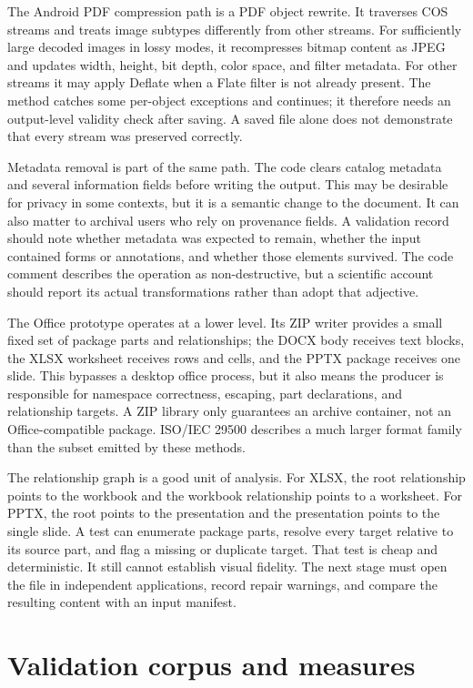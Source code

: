 \documentclass[10pt,letterpaper]{article}
\begin{document}
The Android PDF compression path is a PDF object rewrite. It traverses COS streams and treats image subtypes differently from other streams. For sufficiently large decoded images in lossy modes, it recompresses bitmap content as JPEG and updates width, height, bit depth, color space, and filter metadata. For other streams it may apply Deflate when a Flate filter is not already present. The method catches some per-object exceptions and continues; it therefore needs an output-level validity check after saving. A saved file alone does not demonstrate that every stream was preserved correctly.

Metadata removal is part of the same path. The code clears catalog metadata and several information fields before writing the output. This may be desirable for privacy in some contexts, but it is a semantic change to the document. It can also matter to archival users who rely on provenance fields. A validation record should note whether metadata was expected to remain, whether the input contained forms or annotations, and whether those elements survived. The code comment describes the operation as non-destructive, but a scientific account should report its actual transformations rather than adopt that adjective.

The Office prototype operates at a lower level. Its ZIP writer provides a small fixed set of package parts and relationships; the DOCX body receives text blocks, the XLSX worksheet receives rows and cells, and the PPTX package receives one slide. This bypasses a desktop office process, but it also means the producer is responsible for namespace correctness, escaping, part declarations, and relationship targets. A ZIP library only guarantees an archive container, not an Office-compatible package. ISO/IEC 29500 \cite{r3} describes a much larger format family than the subset emitted by these methods.

The relationship graph is a good unit of analysis. For XLSX, the root relationship points to the workbook and the workbook relationship points to a worksheet. For PPTX, the root points to the presentation and the presentation points to the single slide. A test can enumerate package parts, resolve every target relative to its source part, and flag a missing or duplicate target. That test is cheap and deterministic. It still cannot establish visual fidelity. The next stage must open the file in independent applications, record repair warnings, and compare the resulting content with an input manifest.

\section{Validation corpus and measures}
\end{document}
